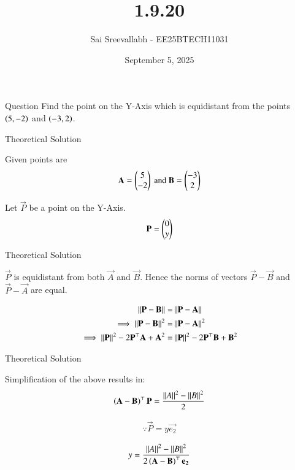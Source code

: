 \documentclass{beamer}
\title 
{1.9.20}
\date{September 5, 2025}
\author 
{Sai Sreevallabh - EE25BTECH11031}
\begin{document}
\frame{\titlepage}
\begin{frame}{Question}
Find the point on the Y-Axis which is equidistant from the points $\left(5,-2\right)$ and $\left(-3,2\right)$.
\end{frame}



\begin{frame}{Theoretical Solution}

Given points are\\
\begin{align}
    \mathbf{A}=\begin{pmatrix}5\\-2\end{pmatrix} \ \text{and}\  \mathbf{B}=\begin{pmatrix}-3\\2\end{pmatrix}
\end{align}

Let $\vec{P}$ be a point on the Y-Axis. \\
\begin{align}
    \mathbf{P}=\begin{pmatrix}0\\y\end{pmatrix}
\end{align}

\end{frame}


\begin{frame}{Theoretical Solution}

$\vec{P}$ is equidistant from both $\vec{A}$ and $\vec{B}$. Hence the norms of vectors $\vec{P}-\vec{B}$ and $\vec{P}-\vec{A}$ are equal. 

\begin{align}
    \left\lVert\mathbf{P}-\mathbf{B}\right\rVert =& \left\lVert\mathbf{P}-\mathbf{A}\right\rVert\\
    \implies  \left\lVert\mathbf{P}-\mathbf{B}\right\rVert^2 =& \left\lVert\mathbf{P}-\mathbf{A}\right\rVert^2\\
    \implies \left\lVert\mathbf{P}\right\rVert^2 - 2\mathbf{P}^\top\mathbf{A} + \mathbf{A}^2 =& \left\lVert\mathbf{P}\right\rVert^2 - 2\mathbf{P}^\top\mathbf{B} + \mathbf{B}^2
\end{align}

\end{frame}

\begin{frame}{Theoretical Solution}

Simplification of the above results in:
\begin{align}
    \left(\mathbf{A}-\mathbf{B}\right)^\top\mathbf{P} = \frac{\left\lVert A\right\rVert^2 - \left\lVert B\right\rVert^2}{2} 
\end{align}

\begin{align}
    \because \vec{P} = y\vec{e_2}   
\end{align}


\begin{align}
    y = \frac{\left\lVert A\right\rVert^2-\left\lVert B\right\rVert^2}{2\left(\mathbf{A}-\mathbf{B}\right)^\top\mathbf{e_2}}
\end{align}

\end{frame}
\end{document}
